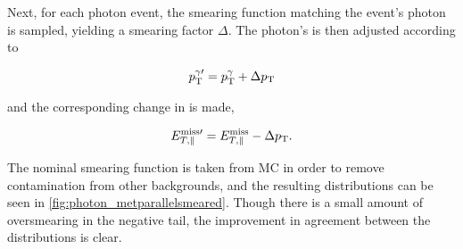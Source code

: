 Next, for each photon event, the smearing function matching the event's photon \pt is sampled, yielding a smearing factor $\Delta$\pt. The photon's \pt is then adjusted according to 

\begin{equation}
p_{\text{T}}^{\gamma\prime} = p_{\text{T}}^\gamma + \Delta p_{\text{T}} 
\end{equation} 

and the corresponding change in \met is made,

\begin{equation}
E_{T,\parallel}^{\text{miss}\prime} = E_{T,\parallel}^{\mathrm{miss}} - \Delta p_{\text{T}}.
\end{equation}

The nominal smearing function is taken from \ac{MC} in order to remove contamination from other backgrounds, and the resulting \metl distributions can be seen in \autoref{fig:photon_metparallelsmeared}. Though there is a small amount of oversmearing in the negative tail, the improvement in agreement between the distributions is clear.

